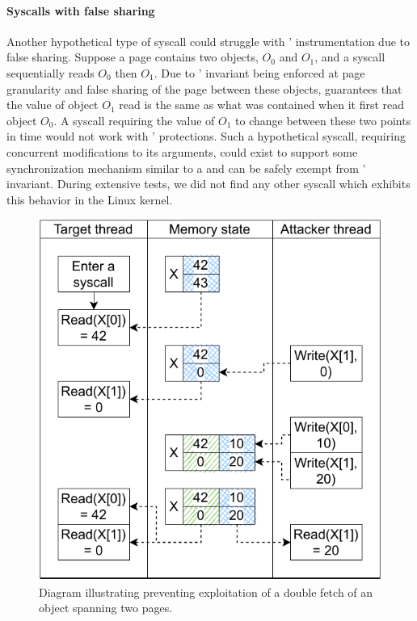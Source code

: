 \documentclass[letterpaper,twocolumn,10pt]{article}
\begin{document}
\paragraph{Syscalls with false sharing}
Another hypothetical type of syscall could struggle with \midas'
instrumentation due to false sharing.
Suppose a page contains two objects, $O_0$ and $O_1$, and a syscall
sequentially reads $O_0$ then $O_1$.
Due to \midas' invariant being enforced at page granularity and
false sharing of the page between these objects, \midas guarantees that
the value of object $O_1$ read is the same as what was contained when it
first read object $O_0$.
A syscall requiring the value of $O_1$ to change between these two
points in time would not work with \midas' protections.
Such a hypothetical syscall, requiring concurrent modifications to its
arguments, could exist to support some synchronization mechanism
similar to a  and can be safely exempt from \midas' invariant.
%
During extensive tests, we did not find any other syscall which exhibits this behavior in the
Linux kernel.


\begin{figure}[]
  \centering
  \includegraphics[width=0.85\linewidth]{img/copy_two_pages.pdf}
  \caption{Diagram illustrating \midas preventing exploitation
  of a double fetch of an object  spanning two pages.}
  \label{fig:copy_two_pages}
\end{figure}
\end{document}
